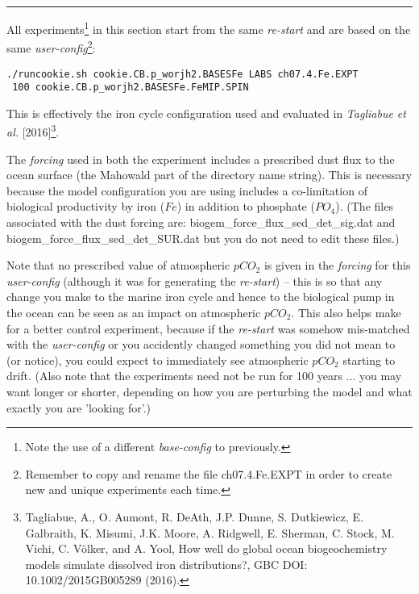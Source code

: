\vspace{1mm}
\noindent\rule{4cm}{0.1mm}
\vspace{2mm}

\newpage
%
\vspace{2mm}

\noindent All experiments\footnote{Note the use of a different \textit{base-config} to previously.} in this section  start from the same \textit{re-start} and are based on the same \textit{user-config}\footnote{Remember to copy and rename the file \textsf{\footnotesize ch07.4.Fe.EXPT} in order to create new and unique experiments each time.}:
\vspace{-1mm}\small\begin{verbatim}
./runcookie.sh cookie.CB.p_worjh2.BASESFe LABS ch07.4.Fe.EXPT
 100 cookie.CB.p_worjh2.BASESFe.FeMIP.SPIN
\end{verbatim}\normalsize\vspace{-1mm}
This is effectively the iron cycle configuration used and evaluated in \textit{Tagliabue et al.} [2016]\footnote{Tagliabue, A., O. Aumont, R. DeAth, J.P. Dunne, S. Dutkiewicz, E. Galbraith, K. Misumi, J.K. Moore, A. Ridgwell, E. Sherman, C. Stock, M. Vichi, C. Völker, and A. Yool, How well do global ocean biogeochemistry models simulate dissolved iron distributions?, GBC DOI: 10.1002/2015GB005289 (2016).}.

\vspace{1mm}
The \textit{forcing} used in both the experiment includes a prescribed dust flux to the ocean surface (the \textsf{\footnotesize Mahowald} part of the directory name string). This is necessary because the model configuration you are using includes a co-limitation of biological productivity by iron (\(Fe\)) in addition to phosphate (\(PO_{4}\)). (The files associated with the dust forcing are: \textsf{\footnotesize biogem\_force\_flux\_sed\_det\_sig.dat} and \textsf{\footnotesize biogem\_force\_flux\_sed\_det\_SUR.dat} but you do not need to edit these files.) 

\vspace{1mm}
Note that no prescribed value of atmospheric \(pCO_{2}\) is given in the \textit{forcing} for this \textit{user-config} (although it was for generating the \textit{re-start}) -- this is so that any change you make to the marine iron cycle and hence to the biological pump in the ocean can be seen as an impact on atmospheric \(pCO_{2}\). This also helps make for a better control experiment, because if the \textit{re-start} was somehow mis-matched with the \textit{user-config}  or you accidently changed something you did not mean to (or notice), you could expect to immediately see atmospheric \(pCO_{2}\) starting to drift. (Also note that the experiments need not be run for 100 years ... you may want longer or shorter, depending on how you are perturbing the model and what exactly you are 'looking for'.)

